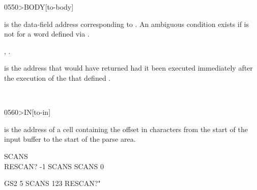 \begin{worddef}[toBODY]{0550}{>BODY}[to-body]
\item {}

	 is the data-field address corresponding to
	. An ambiguous condition exists if  is not
	for a word defined via .

\see {},
	.

	\begin{rationale} %
		 is the address that  would have
		returned had it been executed immediately after the execution
		of the  that defined .
	\end{rationale}

	\begin{testing} %
		 \\
	\end{testing}
\end{worddef}


\begin{worddef}[toIN]{0560}{>IN}[to-in]
\item {}

	 is the address of a cell containing the offset in
	characters from the start of the input buffer to the start of
	the parse area.

	\begin{testing} %
		\ttfamily
		 SCANS \\
		\word{:} RESCAN?  -1 SCANS \word{+!} SCANS   0  \word{!}  \word{;}


		\word{:} GS2  5 SCANS \word{!}  123 RESCAN?"  \word{;} \\
	\end{testing}
\end{worddef}


